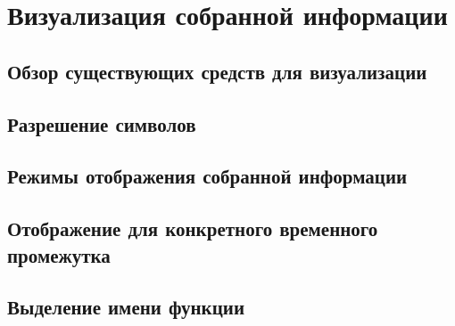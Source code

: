 
\chapter{Визуализация собранной информации}
\section{Обзор существующих средств для визуализации}
\section{Разрешение символов}
\section{Режимы отображения собранной информации}
\section{Отображение для конкретного временного промежутка}
\section{Выделение имени функции}
\chapterconclusion
